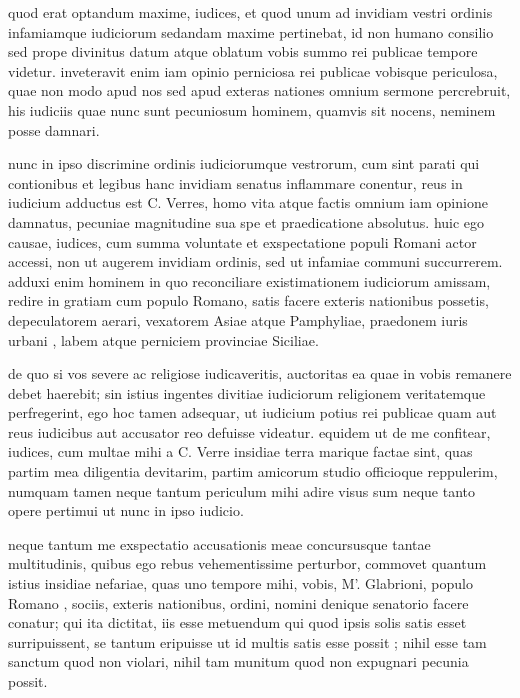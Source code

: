 
 quod erat optandum maxime, iudices, et quod unum ad invidiam vestri ordinis infamiamque iudiciorum sedandam maxime pertinebat, id non humano consilio sed prope divinitus datum atque oblatum vobis summo rei publicae tempore videtur. inveteravit enim iam opinio perniciosa rei publicae vobisque periculosa, quae non modo apud nos sed apud exteras nationes omnium sermone percrebruit, his iudiciis quae nunc sunt pecuniosum hominem, quamvis sit nocens, neminem posse damnari.

 nunc in ipso discrimine ordinis iudiciorumque vestrorum, cum sint parati qui contionibus et legibus hanc invidiam senatus inflammare conentur, reus in iudicium adductus est C. Verres, homo vita atque factis omnium iam opinione damnatus, pecuniae magnitudine sua spe et praedicatione absolutus. huic ego causae, iudices, cum summa voluntate et exspectatione populi Romani actor accessi, non ut augerem invidiam ordinis, sed ut infamiae communi succurrerem. adduxi enim hominem in quo reconciliare existimationem iudiciorum amissam, redire in gratiam cum populo Romano, satis facere exteris nationibus possetis, depeculatorem aerari, vexatorem Asiae atque Pamphyliae, praedonem iuris urbani , labem atque perniciem provinciae Siciliae.

 de quo si vos severe ac religiose iudicaveritis, auctoritas ea quae in vobis remanere debet haerebit; sin istius ingentes divitiae iudiciorum religionem veritatemque perfregerint, ego hoc tamen adsequar, ut iudicium potius rei publicae quam aut reus iudicibus aut accusator reo defuisse videatur. equidem ut de me confitear, iudices, cum multae mihi a C. Verre insidiae terra marique factae sint, quas partim mea diligentia devitarim, partim amicorum studio officioque reppulerim, numquam tamen neque tantum periculum mihi adire visus sum neque tanto opere pertimui ut nunc in ipso iudicio.

 neque tantum me exspectatio accusationis meae concursusque tantae multitudinis, quibus ego rebus vehementissime perturbor, commovet quantum istius insidiae nefariae, quas uno tempore mihi, vobis, M'. Glabrioni, populo Romano , sociis, exteris nationibus, ordini, nomini denique senatorio facere conatur; qui ita dictitat, iis esse metuendum qui quod ipsis solis satis esset surripuissent, se tantum eripuisse ut id multis satis esse possit ; nihil esse tam sanctum quod non violari, nihil tam munitum quod non expugnari pecunia possit.

